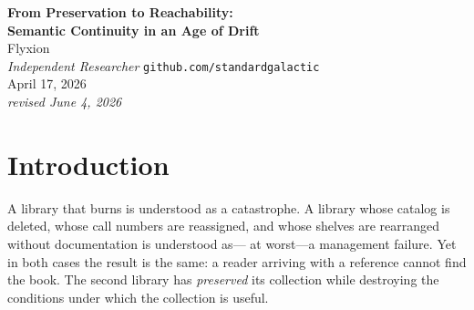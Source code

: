 \documentclass[12pt]{article}
\begin{document}
\begin{center}
  {\LARGE\bfseries From Preservation to Reachability:}\\[0.4em]
  {\large\bfseries Semantic Continuity in an Age of Drift}\\[1.2em]
  {\normalsize Flyxion}\\[0.2em]
  {\small\textit{Independent Researcher} \quad
   \texttt{github.com/standardgalactic}}\\[1.0em]
  {\small April 17, 2026}\\[0.2em]
  {\small\textit{revised June 4, 2026}}
\end{center}

\begin{abstract}
\noindent
Contemporary information systems are typically evaluated in terms of
preservation: archives store documents, platforms retain content, and
institutions maintain records.
This paper argues that preservation is neither the correct invariant nor
the correct design objective for semantic continuity.
What matters is whether semantic states remain \emph{reachable} from future
states through available transformations, and whether such reachability
continues to support processes of reconstruction and reconstitution.
We formalize the distinction between preservation and reachability, introduce
\emph{ecphory} as the activation condition required for semantic reconstruction,
and analyze a series of failure modes in which semantic states persist while
their accessibility collapses.
Extending the framework to language, memory, archives, note systems, and
cultural transmission, we argue that semantic continuity depends on the
maintenance of continuation paths rather than the storage of isolated states.
A field-theoretic interpretation is proposed in terms of scalar persistence,
vector transport, and accessibility fields, leading to a broader conclusion:
what survives across time is not primarily information or representation, but
the possibility that fragments may encounter compatible contexts and become part
of larger reconstructed wholes.
\end{abstract}

\newpage

\section{Introduction}

A library that burns is understood as a catastrophe.
A library whose catalog is deleted, whose call numbers are reassigned, and whose
shelves are rearranged without documentation is understood as---
at worst---a management failure.
Yet in both cases the result is the same: a reader arriving with a reference
cannot find the book.
The second library has \emph{preserved} its collection while destroying the
conditions under which the collection is useful.
\end{document}
